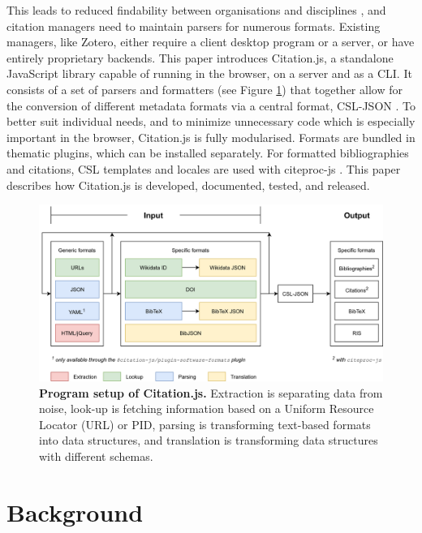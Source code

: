 \documentclass[fleqn,10pt,lineno]{wlpeerj} %
\begin{document}
This leads to reduced findability between organisations and disciplines \citep{godby_repository_2004,zinn_crosswalking_2016}, and citation managers need to maintain parsers for numerous formats. Existing managers, like Zotero, either require a client desktop program or a server, or have entirely proprietary backends. This paper introduces Citation.js, a standalone JavaScript library capable of running in the browser, on a server and as a CLI. It consists of a set of parsers and formatters (see Figure \ref{fig:structure}) that together allow for the conversion of different metadata formats via a central format, CSL-JSON \citep{Bennett2018Juris-M/citeproc-js}. To better suit individual needs, and to minimize unnecessary code which is especially important in the browser, Citation.js is fully modularised. Formats are bundled in thematic plugins, which can be installed separately. For formatted bibliographies and citations, CSL templates and locales are used with citeproc-js \citep{zelle_csl_2012,Bennett2018Juris-M/citeproc-js}. This paper describes how Citation.js is developed, documented, tested, and released.

\begin{figure}[bt]
\centering
\includegraphics[width=\linewidth]{figures/architecture.png}
\caption{\textbf{Program setup of Citation.js.} Extraction is separating data from noise, look-up is fetching information based on a Uniform Resource Locator (URL) or PID, parsing is transforming text-based formats into data structures, and translation is transforming data structures with different schemas.}
\label{fig:structure}
\end{figure}

\section*{Background}
\end{document}
